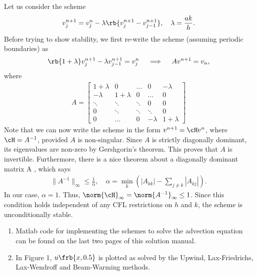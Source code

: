 \documentclass{article}
\begin{document}
\begin{exerciseList}
\item

Let us consider the scheme
\begin{gather} \label{implicit} 	
	v_j^{n+1}=v_j^n -\lambda \rb{v_{j}^{n+1} -v_{j-1}^{n+1}}, \quad \lambda = \frac{ak}{h}. 
\end{gather} 
Before trying to show stability, we first re-write the scheme (assuming periodic boundaries) as 
\begin{gather} \label{implicit_1} 	
	\rb{1 + \lambda} v_{j}^{n+1} -\lambda v_{j-1}^{n+1} =v_j^n \quad \implies \quad A v^{n+1} = v_n,
\end{gather} 
where 
\begin{gather}
A = \begin{bmatrix}
1+\lambda & 0 & \dots & 0 & -\lambda \\
-\lambda & 1+\lambda & 0 & \dots & 0 \\
\ddots & \ddots & \ddots & 0 & 0\\
0 & \ddots & \ddots & \ddots & 0 \\
0 & \dots & 0 & -\lambda & 1 + \lambda
\end{bmatrix}
\end{gather}
Note that we can now write the scheme in the form $v^{n+1} = \cH v^n$, where $\cH = A^{-1}$, provided $A$ is non-singular. Since $A$ is strictly diagonally dominant, its eigenvalues are non-zero by Gershgorin's theorem. This proves that $A$ is invertible. Furthermore, there is a nice theorem \cite{Varah} about a diagonally dominant matrix A , which says 
\begin{gather}
\|A^{-1}\|_\infty \leq \frac{1}{\alpha}, \quad \alpha = \min_k\left(|A_{kk}| - \sum_{j\neq k} |A_{kj}| \right).
\end{gather}
In our case, $\alpha = 1$. Thus, $\norm{\cH}_\infty = \norm{A^{-1}}_\infty \leq 1$. Since this condition holds independent of any CFL restrictions on $h$ and $k$, the scheme is unconditionally stable.



\item
\begin{enumerate}
\item
Matlab code for implementing the schemes to solve the advection equation can be found on the last two pages of this solution manual.

\item
In Figure 1, $u\frb{x,0.5}$ is plotted as solved by the Upwind, Lax-Friedrichs, Lax-Wendroff and Beam-Warming methods.


\end{enumerate}
\end{exerciseList}
\end{document}
